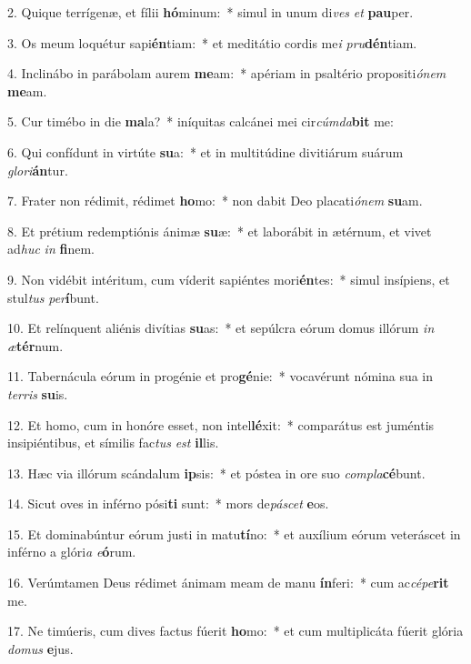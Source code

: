 2. Quique terrígenæ, et fílii \textbf{hó}minum:~*  simul in unum di\textit{ves} \textit{et} \textbf{pau}per.\

3. Os meum loquétur sapi\textbf{én}tiam:~*  et meditátio cordis me\textit{i} \textit{pru}\textbf{dén}tiam.\

4. Inclinábo in parábolam aurem \textbf{me}am:~*  apériam in psaltério propositi\textit{ó}\textit{nem} \textbf{me}am.\

5. Cur timébo in die \textbf{ma}la?~*  iníquitas calcánei mei cir\textit{cúm}\textit{da}\textbf{bit} me:\

6. Qui confídunt in virtúte \textbf{su}a:~*  et in multitúdine divitiárum suárum \textit{glo}\textit{ri}\textbf{án}tur.\

7. Frater non rédimit, rédimet \textbf{ho}mo:~*  non dabit Deo placati\textit{ó}\textit{nem} \textbf{su}am.\

8. Et prétium redemptiónis ánimæ \textbf{su}æ:~*  et laborábit in ætérnum, et vivet ad\textit{huc} \textit{in} \textbf{fi}nem.\

9. Non vidébit intéritum, cum víderit sapiéntes mori\textbf{én}tes:~*  simul insípiens, et stul\textit{tus} \textit{per}\textbf{í}bunt.\

10. Et relínquent aliénis divítias \textbf{su}as:~*  et sepúlcra eórum domus illórum \textit{in} \textit{æ}\textbf{tér}num.\

11. Tabernácula eórum in progénie et pro\textbf{gé}nie:~*  vocavérunt nómina sua in \textit{ter}\textit{ris} \textbf{su}is.\

12. Et homo, cum in honóre esset, non intel\textbf{lé}xit:~*  comparátus est juméntis insipiéntibus, et símilis fac\textit{tus} \textit{est} \textbf{il}lis.\

13. Hæc via illórum scándalum \textbf{ip}sis:~*  et póstea in ore suo \textit{com}\textit{pla}\textbf{cé}bunt.\

14. Sicut oves in inférno pósi\textbf{ti} sunt:~*  mors de\textit{pá}\textit{scet} \textbf{e}os.\

15. Et dominabúntur eórum justi in matu\textbf{tí}no:~*  et auxílium eórum veteráscet in inférno a glóri\textit{a} \textit{e}\textbf{ó}rum.\

16. Verúmtamen Deus rédimet ánimam meam de manu \textbf{ín}feri:~*  cum ac\textit{cé}\textit{pe}\textbf{rit} me.\

17. Ne timúeris, cum dives factus fúerit \textbf{ho}mo:~*  et cum multiplicáta fúerit glória \textit{do}\textit{mus} \textbf{e}jus.\

